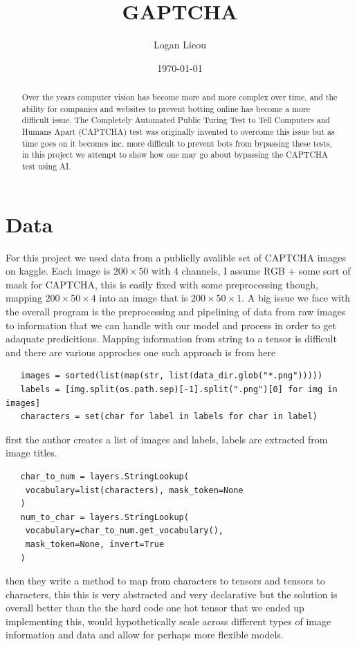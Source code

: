 \documentclass[11pt]{article}
\title{GAPTCHA}
\author{Logan Lieou}
\date{\today}
\begin{document}
\maketitle{}
\newpage

\begin{abstract}
   Over the years computer vision has become more and more complex over time, and the ability for companies and websites to prevent botting online has become a more difficult issue. The Completely Automated Public Turing Test to Tell Computers and Humans Apart (CAPTCHA) test was originally invented to overcome this issue but as time goes on it becomes inc. more difficult to prevent bots from bypassing these tests, in this project we attempt to show how one may go about bypassing the CAPTCHA test using AI.
\end{abstract}
\section{Data}
For this project we used data from a publiclly avalible set of CAPTCHA images on kaggle. Each image is $200\times{}50$ with 4 channels, I assume RGB + some sort of mask for CAPTCHA, this is easily fixed with some preprocessing though, mapping $200\times{}50\times{}4$ into an image that is $200\times{}50\times{}1$. A big issue we face with the overall program is the preprocessing and pipelining of data from raw images to information that we can handle with our model and process in order to get adaquate predicitions. Mapping information from string to a tensor is difficult and there are various approches one such approach is from here \cite{a2019}

\begin{verbatim}
   images = sorted(list(map(str, list(data_dir.glob("*.png")))))
   labels = [img.split(os.path.sep)[-1].split(".png")[0] for img in images]
   characters = set(char for label in labels for char in label)
\end{verbatim}
first the author creates a list of images and labels, labels are extracted from image titles.
\begin{verbatim}
   char_to_num = layers.StringLookup(
    vocabulary=list(characters), mask_token=None
   )
   num_to_char = layers.StringLookup(
    vocabulary=char_to_num.get_vocabulary(), 
    mask_token=None, invert=True
   )
\end{verbatim}
then they write a method to map from characters to tensors and tensors to characters, this this is very abstracted and very declarative but the solution is overall better than the the hard code one hot tensor that we ended up implementing this, would hypothetically scale across different types of image information and data and allow for perhaps more flexible models.
\end{document}
